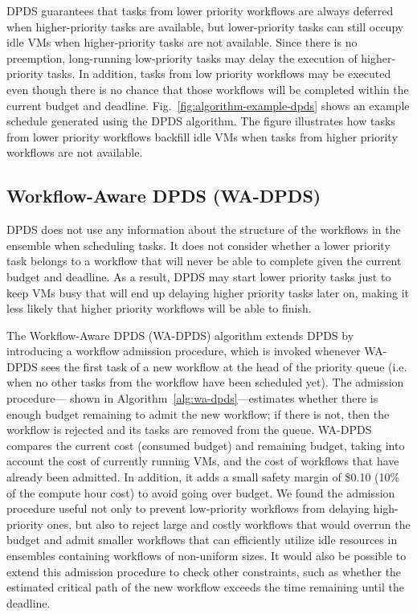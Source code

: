 \documentclass[conference]{IEEEtran}
\begin{document}
DPDS guarantees that tasks from lower priority workflows are always deferred
when higher-priority tasks are available, but lower-priority tasks can still
occupy idle VMs when higher-priority tasks are not available. Since there is
no preemption, long-running low-priority tasks may delay the execution of
higher-priority tasks. In addition, tasks from low priority workflows may be
executed even though there is no chance that those workflows will be completed
within the current budget and deadline. Fig.~\ref{fig:algorithm-example-dpds}
shows an example schedule generated using the DPDS algorithm. The figure
illustrates how tasks from lower priority workflows backfill idle VMs when
tasks from higher priority workflows are not available.


\subsection{Workflow-Aware DPDS (WA-DPDS)}

DPDS does not use any information about the structure of the
workflows in the ensemble when scheduling tasks.  It does not
consider whether a lower priority task belongs to a workflow that will never be
able to complete given the current budget and deadline. As a result, DPDS may
start lower priority tasks just to keep VMs busy that will end up delaying
higher priority tasks later on, making it less likely that higher priority
workflows will be able to finish.

The Workflow-Aware DPDS (WA-DPDS) algorithm extends DPDS by introducing a
workflow admission procedure, which is invoked whenever WA-DPDS sees the first
task of a new workflow at the head of the priority queue (i.e. when no other
tasks from the workflow have been scheduled yet). The admission procedure---
shown in Algorithm~\ref{alg:wa-dpds}---estimates whether there is enough
budget remaining to admit the new workflow; if there is not, then the workflow
is rejected and its tasks are removed from the queue. WA-DPDS compares the
current cost (consumed budget) and remaining budget, taking into account the
cost of currently running VMs, and the cost of workflows that have already
been admitted. In addition, it adds a small safety margin of \$0.10 (10\% of the
compute hour cost) to avoid going over budget. We found the admission procedure useful not only to prevent
low-priority workflows from delaying high-priority ones, but also to reject
large and costly workflows that would overrun the budget and admit smaller
workflows that can efficiently utilize idle resources in 
ensembles containing workflows of non-uniform sizes. It would also be possible 
to extend this admission procedure to check other constraints, such as whether
the estimated critical path of the new workflow exceeds the time remaining
until the deadline.
\end{document}
